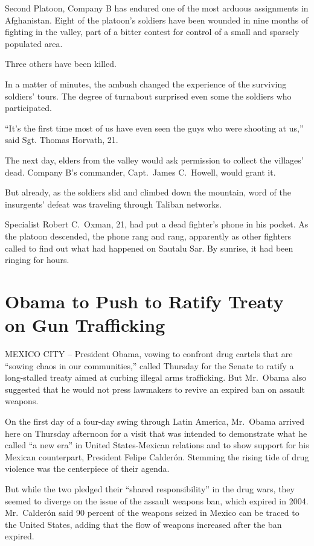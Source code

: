 \documentclass[12pt,a4paper,onecolumn]{article}
\begin{document}
Second Platoon, Company B has endured one of the most arduous assignments in Afghanistan. Eight of
the platoon's soldiers have been wounded in nine months of fighting in the valley, part of a bitter
contest for control of a small and sparsely populated area.

Three others have been killed.

In a matter of minutes, the ambush changed the experience of the surviving soldiers' tours. The
degree of turnabout surprised even some the soldiers who participated.

``It's the first time most of us have even seen the guys who were shooting at us,'' said Sgt. Thomas
Horvath, 21.

The next day, elders from the valley would ask permission to collect the villages' dead. Company B's
commander, Capt.~James C.~Howell, would grant it.

But already, as the soldiers slid and climbed down the mountain, word of the insurgents' defeat was
traveling through Taliban networks.

Specialist Robert C.~Oxman, 21, had put a dead fighter's phone in his pocket. As the platoon
descended, the phone rang and rang, apparently as other fighters called to find out what had
happened on Sautalu Sar. By sunrise, it had been ringing for hours.

\section{Obama to Push to Ratify Treaty on Gun Trafficking}

MEXICO CITY -- President Obama, vowing to confront drug cartels that are ``sowing chaos in our
communities,'' called Thursday for the Senate to ratify a long-stalled treaty aimed at curbing
illegal arms trafficking. But Mr.~Obama also suggested that he would not press lawmakers to revive
an expired ban on assault weapons.

On the first day of a four-day swing through Latin America, Mr.~Obama arrived here on Thursday
afternoon for a visit that was intended to demonstrate what he called ``a new era'' in United
States-Mexican relations and to show support for his Mexican counterpart, President Felipe Calderón.
Stemming the rising tide of drug violence was the centerpiece of their agenda.

But while the two pledged their ``shared responsibility'' in the drug wars, they seemed to diverge
on the issue of the assault weapons ban, which expired in 2004. Mr.~Calderón said 90 percent of the
weapons seized in Mexico can be traced to the United States, adding that the flow of weapons
increased after the ban expired.
\end{document}
